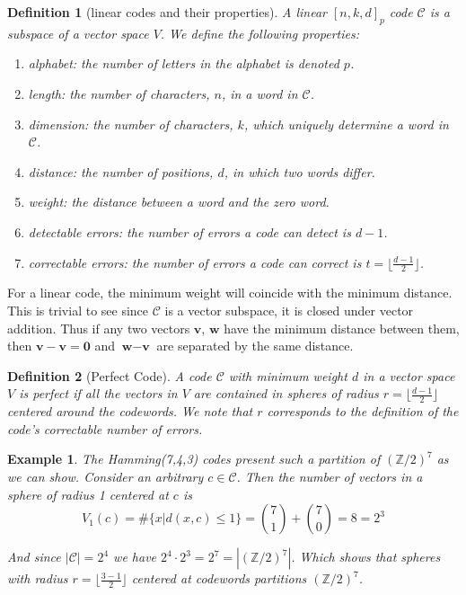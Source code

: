 \documentclass[paper=a4, fontsize=11pt]{scrartcl} %
\numberwithin{equation}{section} %
\numberwithin{figure}{section} %
\numberwithin{table}{section} %
\theoremstyle{break}
\newtheorem{defn}{Definition}
\newtheorem{ex}{Example}
\begin{document}
\begin{defn}[linear codes and their properties]
A linear $[n,k,d]_p$ code $\mathcal{C}$ is a subspace of a vector space $V$. We define the following properties:
\begin{enumerate}
\item \textit{alphabet}: the number of letters in the alphabet is denoted $p$.
\item \textit{length}: the number of characters, $n$, in a word in $\mathcal{C}$.
\item \textit{dimension}: the number of characters, $k$, which uniquely determine a word in $\mathcal{C}$.
\item \textit{distance}: the number of positions, $d$, in which two words differ.
\item \textit{weight}: the distance between a word and the zero word.
\item \textit{detectable errors}: the number of errors a code can detect is $d-1$.
\item \textit{correctable errors}: the number of errors a code can correct is $t=\lfloor \frac{d-1}{2} \rfloor$.
\end{enumerate} 
\end{defn}

For a linear code, the minimum weight will coincide with the minimum distance. This is trivial to see since $\mathcal{C}$ is a vector subspace, it is closed under vector addition. Thus if any two vectors $\textbf{v}$, $\textbf{w}$ have the minimum distance between them, then $\textbf{v}-\textbf{v}=\textbf{0}$ and $\textbf{w}-\textbf{v}$ are separated by the same distance.

\begin{defn}[Perfect Code]
A code $\mathcal{C}$ with minimum weight $d$ in a vector space $V$ is \textit{perfect} if all the vectors in $V$ are contained in spheres of radius $r=\lfloor \frac{d-1}{2} \rfloor$ centered around the codewords. We note that $r$ corresponds to the definition of the code's correctable number of errors.
\end{defn}

\begin{ex}
The Hamming(7,4,3) codes present such a partition of $(\mathbb{Z}/2)^7$ as we can show. Consider an arbitrary $c \in \mathcal{C}$. Then the number of vectors in a sphere of radius 1 centered at $c$ is
$$
V_1(c) = \#\{x | d(x,c)\leq 1 \} = {7 \choose 1} + {7 \choose 0} = 8 = 2^3
$$

And since $|\mathcal{C}|= 2^4$ we have $2^4 \cdot 2^3 = 2^7=|(\mathbb{Z}/2)^7|$. Which shows that spheres with radius $r = \lfloor \frac{3-1}{2} \rfloor$ centered at codewords partitions $(\mathbb{Z}/2)^7$. 
\end{ex}
\end{document}
